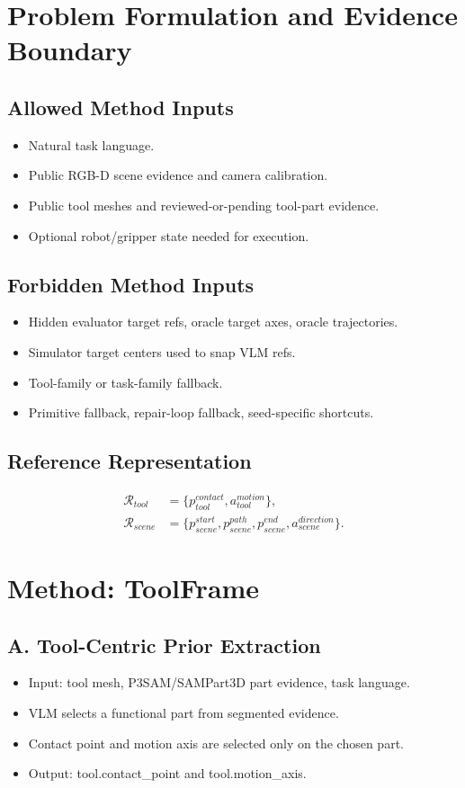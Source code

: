 \documentclass[journal]{IEEEtran}
\begin{document}
\section{Problem Formulation and Evidence Boundary}
\subsection{Allowed Method Inputs}
\begin{itemize}
  \item Natural task language.
  \item Public RGB-D scene evidence and camera calibration.
  \item Public tool meshes and reviewed-or-pending tool-part evidence.
  \item Optional robot/gripper state needed for execution.
\end{itemize}

\subsection{Forbidden Method Inputs}
\begin{itemize}
  \item Hidden evaluator target refs, oracle target axes, oracle trajectories.
  \item Simulator target centers used to snap VLM refs.
  \item Tool-family or task-family fallback.
  \item Primitive fallback, repair-loop fallback, seed-specific shortcuts.
\end{itemize}

\subsection{Reference Representation}
\begin{align}
\mathcal{R}_{tool} &= \{p^{contact}_{tool}, a^{motion}_{tool}\}, \\
\mathcal{R}_{scene} &= \{p^{start}_{scene}, p^{path}_{scene},
p^{end}_{scene}, a^{direction}_{scene}\}.
\end{align}

\section{Method: ToolFrame}
\subsection{A. Tool-Centric Prior Extraction}
\begin{itemize}
  \item Input: tool mesh, P3SAM/SAMPart3D part evidence, task language.
  \item VLM selects a functional part from segmented evidence.
  \item Contact point and motion axis are selected only on the chosen part.
  \item Output: tool.contact\_point and tool.motion\_axis.
\end{itemize}
\end{document}
